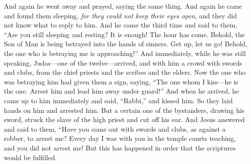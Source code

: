 \begin{biblechapter}
\verse And again he went away and prayed, saying the same thing.
\verse And again he came and found them sleeping, \textit{for they could not keep their eyes open}, and they did not know what to reply to him.
\verse And he came the third time and said to them, “Are you still sleeping and resting? It is enough! The hour has come. Behold, the Son of Man is being betrayed into the hands of sinners.
\verse Get up, let us go! Behold, the one who is betraying me is approaching!”
 And immediately, while he was still speaking, Judas—one of the twelve—arrived, and with him a crowd with swords and clubs, from the chief priests and the scribes and the elders.
\verse Now the one who was betraying him had given them a sign, saying, “The one whom I kiss—he is the one. Arrest him and lead him away under guard!”
\verse And when he arrived, he came up to him immediately and said, “Rabbi,” and kissed him.
\verse So they laid hands on him and arrested him.
\verse But a certain one of the bystanders, drawing his sword, struck the slave of the high priest and cut off his ear.
\verse And Jesus answered and said to them, “Have you come out with swords and clubs, as against a robber, to arrest me?
\verse Every day I was with you in the temple courts teaching, and you did not arrest me! But this has happened in order that the scriptures would be fulfilled.

\end{biblechapter}
